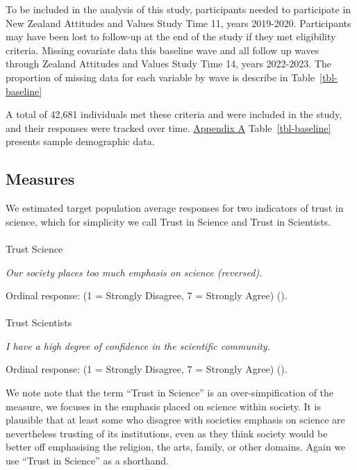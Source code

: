 \documentclass[
  single column]{article}
\makeatletter
\let\oldparagraph\paragraph
\renewcommand{\paragraph}{
    \@ifstar
      \xxxParagraphStar
      \xxxParagraphNoStar
  }
\newcommand{\xxxParagraphStar}[1]{\oldparagraph*{#1}\mbox{}}
\newcommand{\xxxParagraphNoStar}[1]{\oldparagraph{#1}\mbox{}}
\makeatother
\begin{document}
To be included in the analysis of this study, participants needed to
participate in New Zealand Attitudes and Values Study Time 11, years
2019-2020. Participants may have been lost to follow-up at the end of
the study if they met eligibility criteria. Missing covariate data this
baseline wave and all follow up waves through Zealand Attitudes and
Values Study Time 14, years 2022-2023. The proportion of missing data
for each variable by wave is describe in Table~\ref{tbl-baseline}

A total of 42,681 individuals met these criteria and were included in
the study, and their responses were tracked over time.
\hyperref[appendix-a]{Appendix A} Table~\ref{tbl-baseline} presents
sample demographic data.

\subsection{Measures}\label{measures}

We estimated target population average responses for two indicators of
trust in science, which for simplicity we call Trust in Science and
Trust in Scientists.

\paragraph{Trust Science}\label{trust-science}

\emph{Our society places too much emphasis on science (reversed).}

Ordinal response: (1 = Strongly Disagree, 7 = Strongly Agree)
().

\paragraph{Trust Scientists}\label{trust-scientists}

\emph{I have a high degree of confidence in the scientific community.}

Ordinal response: (1 = Strongly Disagree, 7 = Strongly Agree)
().

We note note that the term ``Trust in Science'' is an over-simpification
of the measure, we focuses in the emphasis placed on science within
society. It is plausible that at least some who disagree with societies
emphasis on science are nevertheless trusting of its institutions, even
as they think society would be better off emphasising the religion, the
arts, family, or other domains. Again we use ``Trust in Science'' as a
shorthand.
\end{document}
